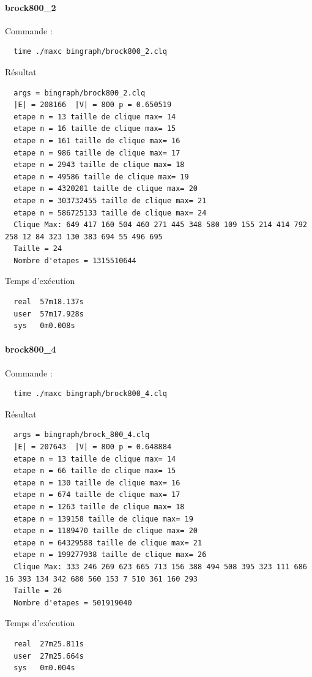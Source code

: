 \documentclass{article}
\begin{document}
\paragraph{brock800\_2}
Commande :
\begin{verbatim}
  time ./maxc bingraph/brock800_2.clq
\end{verbatim}
Résultat
\begin{verbatim}
  args = bingraph/brock800_2.clq
  |E| = 208166  |V| = 800 p = 0.650519
  etape n = 13 taille de clique max= 14
  etape n = 16 taille de clique max= 15
  etape n = 161 taille de clique max= 16
  etape n = 986 taille de clique max= 17
  etape n = 2943 taille de clique max= 18
  etape n = 49586 taille de clique max= 19
  etape n = 4320201 taille de clique max= 20
  etape n = 303732455 taille de clique max= 21
  etape n = 586725133 taille de clique max= 24
  Clique Max: 649 417 160 504 460 271 445 348 580 109 155 214 414 792 258 12 84 323 130 383 694 55 496 695
  Taille = 24
  Nombre d'etapes = 1315510644
\end{verbatim}
Temps d'exécution
\begin{verbatim}
  real  57m18.137s
  user  57m17.928s
  sys   0m0.008s
\end{verbatim}
\paragraph{brock800\_4}
Commande :
\begin{verbatim}
  time ./maxc bingraph/brock800_4.clq
\end{verbatim}
Résultat
\begin{verbatim}
  args = bingraph/brock_800_4.clq
  |E| = 207643  |V| = 800 p = 0.648884
  etape n = 13 taille de clique max= 14
  etape n = 66 taille de clique max= 15
  etape n = 130 taille de clique max= 16
  etape n = 674 taille de clique max= 17
  etape n = 1263 taille de clique max= 18
  etape n = 139158 taille de clique max= 19
  etape n = 1189470 taille de clique max= 20
  etape n = 64329588 taille de clique max= 21
  etape n = 199277938 taille de clique max= 26
  Clique Max: 333 246 269 623 665 713 156 388 494 508 395 323 111 686 16 393 134 342 680 560 153 7 510 361 160 293
  Taille = 26
  Nombre d'etapes = 501919040
\end{verbatim}
Temps d'exécution
\begin{verbatim}
  real  27m25.811s
  user  27m25.664s
  sys   0m0.004s
\end{verbatim}
\end{document}
